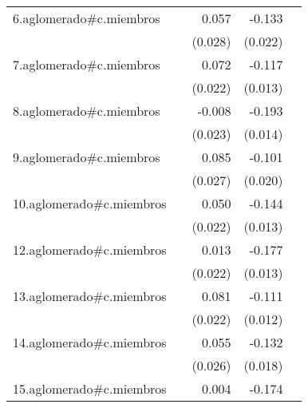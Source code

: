 {\begin{longtable}{l*{4}{D{.}{.}{-1}}}
\addlinespace
6.aglomerado#c.miembros&                     &       0.057\sym{*}  &      -0.133\sym{***}&                     \\
            &                     &     (0.028)         &     (0.022)         &                     \\
\addlinespace
7.aglomerado#c.miembros&                     &       0.072\sym{**} &      -0.117\sym{***}&                     \\
            &                     &     (0.022)         &     (0.013)         &                     \\
\addlinespace
8.aglomerado#c.miembros&                     &      -0.008         &      -0.193\sym{***}&                     \\
            &                     &     (0.023)         &     (0.014)         &                     \\
\addlinespace
9.aglomerado#c.miembros&                     &       0.085\sym{**} &      -0.101\sym{***}&                     \\
            &                     &     (0.027)         &     (0.020)         &                     \\
\addlinespace
10.aglomerado#c.miembros&                     &       0.050\sym{*}  &      -0.144\sym{***}&                     \\
            &                     &     (0.022)         &     (0.013)         &                     \\
\addlinespace
12.aglomerado#c.miembros&                     &       0.013         &      -0.177\sym{***}&                     \\
            &                     &     (0.022)         &     (0.013)         &                     \\
\addlinespace
13.aglomerado#c.miembros&                     &       0.081\sym{***}&      -0.111\sym{***}&                     \\
            &                     &     (0.022)         &     (0.012)         &                     \\
\addlinespace
14.aglomerado#c.miembros&                     &       0.055\sym{*}  &      -0.132\sym{***}&                     \\
            &                     &     (0.026)         &     (0.018)         &                     \\
\addlinespace
15.aglomerado#c.miembros&                     &       0.004         &      -0.174\sym{***}&                     \\

\end{longtable}}
